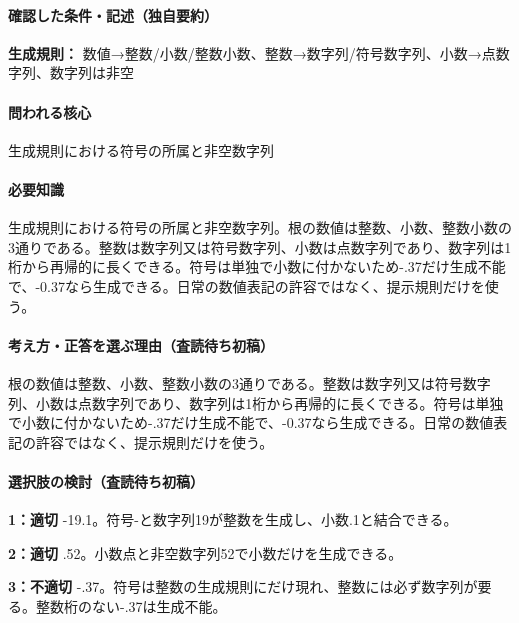 \paragraph{確認した条件・記述（独自要約）}\mbox{}\par

\noindent\textbf{生成規則：} 数値→整数/小数/整数小数、整数→数字列/符号数字列、小数→点数字列、数字列は非空\par

\paragraph{問われる核心} 生成規則における符号の所属と非空数字列

\paragraph{必要知識} 生成規則における符号の所属と非空数字列。根の数値は整数、小数、整数小数の3通りである。整数は数字列又は符号数字列、小数は点数字列であり、数字列は1桁から再帰的に長くできる。符号は単独で小数に付かないため-.37だけ生成不能で、-0.37なら生成できる。日常の数値表記の許容ではなく、提示規則だけを使う。

\paragraph{考え方・正答を選ぶ理由（査読待ち初稿）} 根の数値は整数、小数、整数小数の3通りである。整数は数字列又は符号数字列、小数は点数字列であり、数字列は1桁から再帰的に長くできる。符号は単独で小数に付かないため-.37だけ生成不能で、-0.37なら生成できる。日常の数値表記の許容ではなく、提示規則だけを使う。

\paragraph{選択肢の検討（査読待ち初稿）}\mbox{}\par

\noindent\textbf{1：適切} -19.1。符号-と数字列19が整数を生成し、小数.1と結合できる。\par

\noindent\textbf{2：適切} .52。小数点と非空数字列52で小数だけを生成できる。\par

\noindent\textbf{3：不適切} -.37。符号は整数の生成規則にだけ現れ、整数には必ず数字列が要る。整数桁のない-.37は生成不能。\par


